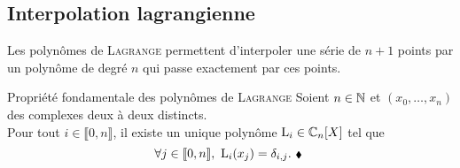 \subsection{Interpolation lagrangienne}

Les polynômes de \textsc{Lagrange} permettent d'interpoler une série de $n+1$ points par un polynôme de degré $n$ qui passe exactement par ces points.

\begin{theo}{Propriété fondamentale des polynômes de \textsc{Lagrange}}
    Soient $n \in \mathbb{N}$ et $(x_0, \dots, x_n)$ des complexes deux à deux distincts. \\
    Pour tout $i \in \llbracket 0, n \rrbracket$, il existe un unique polynôme $\mathrm{L}_i \in \mathbb{C}_n[X]$ tel que 
    \begin{equation} \label{prop_fondamentale}
        \forall j \in \llbracket 0, n \rrbracket,\ \mathrm{L}_i(x_j) = \delta_{i,j}.\ \hbox{\scriptsize $\blacklozenge$\ }
    \end{equation}
\end{theo}


